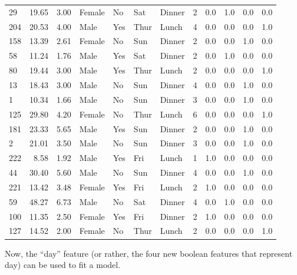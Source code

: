 \documentclass[
  letterpaper,
  DIV=11,
  numbers=noendperiod]{scrreprt}
\begin{document}
\begin{tabular}{lrrllllrrrrr}
29  &       19.65 &  3.00 &  Female &     No &   Sat &  Dinner &     2 &     0.0 &     1.0 &     0.0 &      0.0 \\
204 &       20.53 &  4.00 &    Male &    Yes &  Thur &   Lunch &     4 &     0.0 &     0.0 &     0.0 &      1.0 \\
158 &       13.39 &  2.61 &  Female &     No &   Sun &  Dinner &     2 &     0.0 &     0.0 &     1.0 &      0.0 \\
58  &       11.24 &  1.76 &    Male &    Yes &   Sat &  Dinner &     2 &     0.0 &     1.0 &     0.0 &      0.0 \\
80  &       19.44 &  3.00 &    Male &    Yes &  Thur &   Lunch &     2 &     0.0 &     0.0 &     0.0 &      1.0 \\
13  &       18.43 &  3.00 &    Male &     No &   Sun &  Dinner &     4 &     0.0 &     0.0 &     1.0 &      0.0 \\
1   &       10.34 &  1.66 &    Male &     No &   Sun &  Dinner &     3 &     0.0 &     0.0 &     1.0 &      0.0 \\
125 &       29.80 &  4.20 &  Female &     No &  Thur &   Lunch &     6 &     0.0 &     0.0 &     0.0 &      1.0 \\
181 &       23.33 &  5.65 &    Male &    Yes &   Sun &  Dinner &     2 &     0.0 &     0.0 &     1.0 &      0.0 \\
2   &       21.01 &  3.50 &    Male &     No &   Sun &  Dinner &     3 &     0.0 &     0.0 &     1.0 &      0.0 \\
222 &        8.58 &  1.92 &    Male &    Yes &   Fri &   Lunch &     1 &     1.0 &     0.0 &     0.0 &      0.0 \\
44  &       30.40 &  5.60 &    Male &     No &   Sun &  Dinner &     4 &     0.0 &     0.0 &     1.0 &      0.0 \\
221 &       13.42 &  3.48 &  Female &    Yes &   Fri &   Lunch &     2 &     1.0 &     0.0 &     0.0 &      0.0 \\
59  &       48.27 &  6.73 &    Male &     No &   Sat &  Dinner &     4 &     0.0 &     1.0 &     0.0 &      0.0 \\
100 &       11.35 &  2.50 &  Female &    Yes &   Fri &  Dinner &     2 &     1.0 &     0.0 &     0.0 &      0.0 \\
127 &       14.52 &  2.00 &  Female &     No &  Thur &   Lunch &     2 &     0.0 &     0.0 &     0.0 &      1.0 \\
\bottomrule
\end{tabular}

Now, the ``day'' feature (or rather, the four new boolean features that
represent day) can be used to fit a model.
\end{document}
